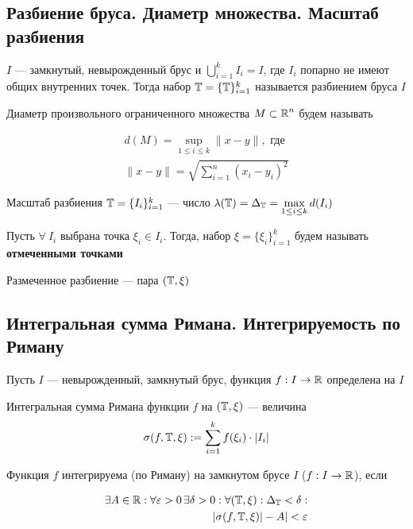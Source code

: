 \subsection{Разбиение бруса. Диаметр множества. Масштаб разбиения}

 \label{1.3} $I$ — замкнутый, невырожденный брус и $\displaystyle\bigcup_{i=1}^kI_i = I$, где $I_i$ попарно не имеют общих внутренних точек. Тогда набор $\operatorname{\mathbb{T}} = \{\operatorname{\mathbb{T}}\}_{i=1}^k$ называется разбиением бруса $I$

 \label{1.4} Диаметр произвольного ограниченного множества $M\subset\operatorname{\mathbb{R}}^n$ будем называть 

\begin{equation*}
\begin{aligned}
    d(M) = \displaystyle\sup_{1\leq i\leq k}\|x-y\|,\text{ где}\\
    \|x-y\|=\sqrt{\sum_{i=1}^{n}\left(x_i-y_i\right)^2}
\end{aligned}
\end{equation*}

\begin{center}
    
\end{center}


 \label{1.5} Масштаб разбиения $\operatorname{\mathbb{T}}=\{I_i\}_{i=1}^k$ — число $\lambda(\operatorname{\mathbb{T}}) = \Delta_{\operatorname{\mathbb{T}}} = \displaystyle\max_{1\le i\le k} d(I_i)$

 \label{1.6} Пусть $\forall\ I_i$ выбрана точка $\xi_i\in I_i$. Тогда, набор $\xi = \{\xi_i\}_{i=1}^k$ будем называть \textbf{отмеченными точками}

 \label{1.7} Размеченное разбиение — пара $(\operatorname{\mathbb{T}}, \xi)$

\subsection{Интегральная сумма Римана. Интегрируемость по Риману}
Пусть $I$ — невырожденный, замкнутый брус, функция $f: I\rightarrow \operatorname{\mathbb{R}}$ определена на $I$

 \label{1.8} Интегральная сумма Римана функции $f$ на $(\operatorname{\mathbb{T}}, \xi)$ — величина
$$\sigma(f, \T, \xi) := \sum_{i=1}^kf(\xi_i)\cdot|I_i|$$

 \label{1.9} Функция $f$ интегрируема (по Риману) на замкнутом брусе $I$ ($f:I\rightarrow\operatorname{\mathbb{R}}$), если 

\begin{equation*}
\begin{aligned}
    \exists A\in\operatorname{\mathbb{R}}: \forall \varepsilon > 0\, \exists \delta > 0: \forall(\operatorname{\mathbb{T}}, \xi): \Delta_{\operatorname{\mathbb{T}}} < \delta:\\
    |\sigma(f, \operatorname{\mathbb{T}}, \xi)| - A| < \varepsilon
\end{aligned}
\end{equation*}

